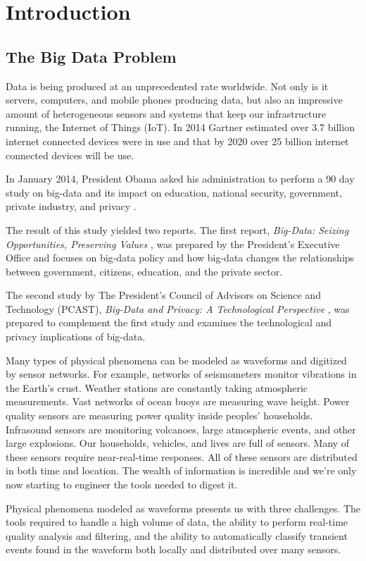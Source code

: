 \chapter{Introduction}
\section{The Big Data Problem}
Data is being produced at an unprecedented rate worldwide. Not only is it servers, computers, and mobile phones producing data, but also an impressive amount of heterogeneous sensors and systems that keep our infrastructure running, the Internet of Things (IoT). In 2014 Gartner estimated over 3.7 billion internet connected devices were in use and that by 2020 over 25 billion internet connected devices will be use. 

In January 2014, President Obama asked his administration to perform a 90 day study on big-data and its impact on education, national security, government, private industry, and privacy \cite{wh_web:00}.

The result of this study yielded two reports. The first report, \textit{Big-Data: Seizing Opportunities, Preserving Values} \cite{wh_big_data}, was prepared by the President's Executive Office and focuses on big-data policy and how big-data changes the relationships between government, citizens, education, and the private sector.

The second study by The President's Council of Advisors on Science and Technology (PCAST),  \textit{Big-Data and Privacy: A Technological Perspective} \cite{pcast2014}, was prepared to complement the first study and examines the technological and privacy implications of big-data.

Many types of physical phenomena can be modeled as waveforms and digitized by sensor networks. For example, networks of seismometers monitor vibrations in the Earth's crust. Weather stations are constantly taking atmospheric measurements. Vast networks of ocean buoys are measuring wave height. Power quality sensors are measuring power quality inside peoples' households. Infrasound sensors are monitoring volcanoes, large atmospheric events, and other large explosions. Our households, vehicles, and lives are full of sensors. Many of these sensors require near-real-time responses. All of these sensors are distributed in both time and location. The wealth of information is incredible and we're only now starting to engineer the tools needed to digest it.

Physical phenomena modeled as waveforms presents us with three challenges. The tools required to handle a high volume of data, the ability to perform real-time quality analysis and filtering, and the ability to automatically classify transient events found in the waveform both locally and distributed over many sensors.

